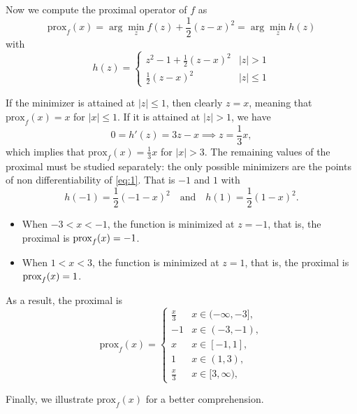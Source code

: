 \documentclass[12pt]{scrartcl}
\begin{document}
Now we compute the proximal operator of $f$ as 
\[
    \mbox{prox}_f(x) = \arg \min_z f(z) + \frac 1 2 (z - x)^2 = \arg \min_z h(z)
\]
with
\begin{equation}\label{eq:1}
h(z) = \begin{cases}
        z^2 - 1 + \frac 1 2 (z - x)^2 & |z| > 1 \\
        \frac 1 2 (z - x)^2 & |z| \leq 1 \end{cases}
\end{equation}


If the minimizer is attained at $|z| \leq 1$, then clearly $z = x$, meaning that $\mbox{prox}_f(x) = x$ for $|x| \leq 1$. If it is attained at $|z| > 1$, we have
\[
    0 = h'(z) = 3z - x \implies z = \frac 1 3 x,  
\]
which implies that $\mbox{prox}_f (x)= \frac 1 3 x$ for $|x| > 3$. The remaining values of the proximal must be studied separately: the only possible minimizers are the points of non differentiability of \eqref{eq:1}. That is $-1$ and $1$ with 
\[
    h(-1) = \frac 1 2 (-1 -x)^2 \quad \text{and} \quad h(1) = \frac 1 2 (1-x)^2.  
\]
\begin{itemize}
    \item When $-3 < x < -1$, the function is minimized at $z = -1$, that is, the proximal is $\hbox{prox}_f(x) = -1$.
    \item When $1 < x < 3$, the function is minimized at $z = 1$, that is, the proximal is $\hbox{prox}_f(x) = 1$.
\end{itemize}
As a result, the proximal is
\[
    \mbox{prox}_f (x) = 
    \begin{cases}
        \frac x 3 & x \in  (-\infty, -3], \\
        -1 & x \in (-3,-1), \\
        x &  x \in [-1, 1],\\
        1 & x \in (1,3), \\
        \frac x 3 & x \in  [3, \infty),
    \end{cases}
\]

Finally, we illustrate $\mbox{prox}_f (x)$ for a better comprehension.
\end{document}
